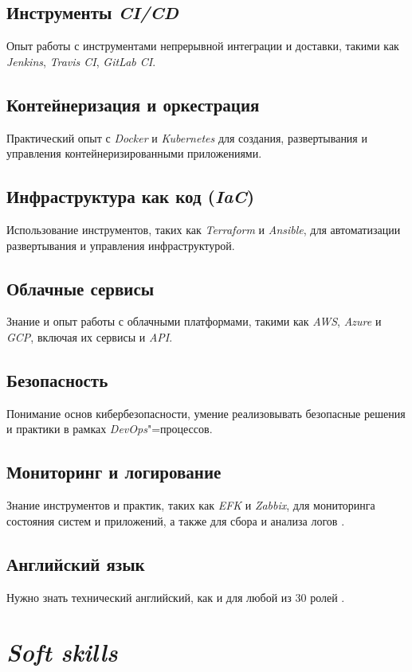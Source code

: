 \documentclass[variant=practice]{bsuir}
\begin{document}
\subsection{Инструменты \textit{CI/CD}} Опыт работы с инструментами непрерывной
интеграции и доставки, такими как \textit{Jenkins}, \textit{Travis CI},
\textit{GitLab CI}.

\subsection{Контейнеризация и оркестрация} Практический опыт с \textit{Docker} и
\textit{Kubernetes} для создания, развертывания и управления
контейнеризированными приложениями.

\subsection{Инфраструктура как код (\textit{IaC})} Использование инструментов,
таких как \textit{Terraform} и \textit{Ansible}, для автоматизации развертывания
и управления инфраструктурой.

\subsection{Облачные сервисы} Знание и опыт работы с облачными платформами,
такими как \textit{AWS}, \textit{Azure} и \textit{GCP}, включая их сервисы и
\textit{API}.

\subsection{Безопасность} Понимание основ кибербезопасности, умение
реализовывать безопасные решения и практики в рамках \textit{DevOps}"=процессов.

\subsection{Мониторинг и логирование} Знание инструментов и практик, таких как
\textit{EFK} и \textit{Zabbix}, для мониторинга состояния систем и приложений, а
также для сбора и анализа логов \cite{devops-mts}.

\subsection{Английский язык} Нужно знать технический английский, как и для любой
из 30 ролей \cite{devops-mts}.

\section{\textit{Soft skills}}
\end{document}
